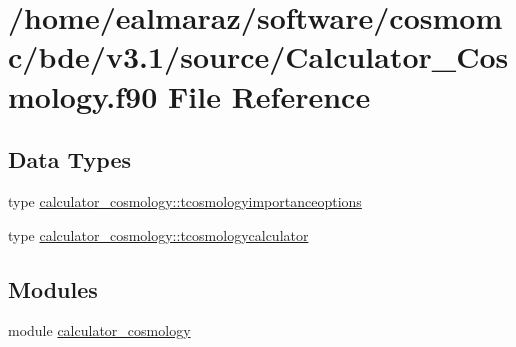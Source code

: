 \hypertarget{Calculator__Cosmology_8f90}{}\section{/home/ealmaraz/software/cosmomc/bde/v3.1/source/\+Calculator\+\_\+\+Cosmology.f90 File Reference}
\label{Calculator__Cosmology_8f90}
\subsection*{Data Types}
\begin{DoxyCompactItemize}
\item 
type \mbox{\hyperlink{structcalculator__cosmology_1_1tcosmologyimportanceoptions}{calculator\+\_\+cosmology\+::tcosmologyimportanceoptions}}
\item 
type \mbox{\hyperlink{structcalculator__cosmology_1_1tcosmologycalculator}{calculator\+\_\+cosmology\+::tcosmologycalculator}}
\end{DoxyCompactItemize}
\subsection*{Modules}
\begin{DoxyCompactItemize}
\item 
module \mbox{\hyperlink{namespacecalculator__cosmology}{calculator\+\_\+cosmology}}
\end{DoxyCompactItemize}
